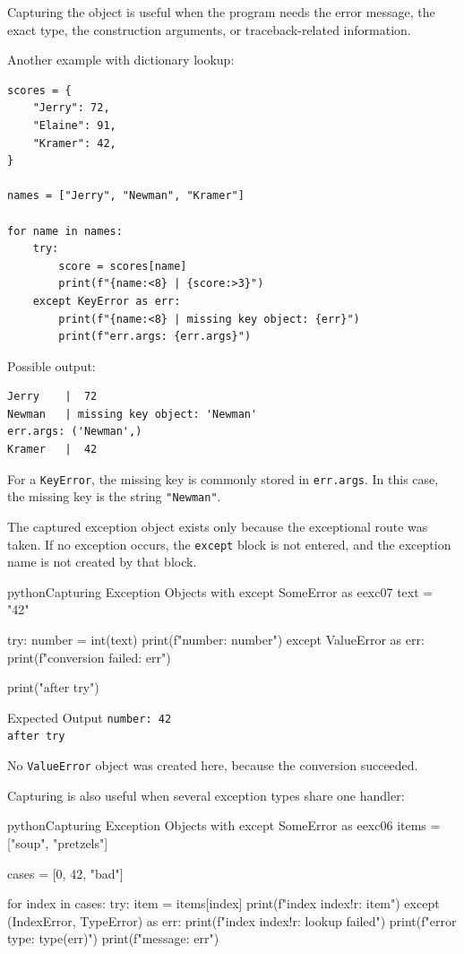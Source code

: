 \documentclass[a4paper,twoside]{report}
\begin{document}
Capturing the object is useful when the program needs the error message, the exact type, the construction arguments, or traceback-related information.

Another example with dictionary lookup:

\begin{verbatim}
scores = {
    "Jerry": 72,
    "Elaine": 91,
    "Kramer": 42,
}

names = ["Jerry", "Newman", "Kramer"]

for name in names:
    try:
        score = scores[name]
        print(f"{name:<8} | {score:>3}")
    except KeyError as err:
        print(f"{name:<8} | missing key object: {err}")
        print(f"err.args: {err.args}")
\end{verbatim}

Possible output:

\begin{verbatim}
Jerry    |  72
Newman   | missing key object: 'Newman'
err.args: ('Newman',)
Kramer   |  42
\end{verbatim}

For a \texttt{KeyError}, the missing key is commonly stored in \texttt{err.args}. In this case, the missing key is the string \texttt{"Newman"}.

The captured exception object exists only because the exceptional route was taken. If no exception occurs, the \texttt{except} block is not entered, and the exception name is not created by that block.

\begin{codebox}[]{python}{Capturing Exception Objects with except SomeError as e}{exc07}
text = "42"

try:
    number = int(text)
    print(f"number: {number}")
except ValueError as err:
    print(f"conversion failed: {err}")

print("after try")
\end{codebox}


\begin{iobox}{Expected Output}
\texttt{number: 42} \\
\texttt{after try} \\
\end{iobox}


No \texttt{ValueError} object was created here, because the conversion succeeded.

Capturing is also useful when several exception types share one handler:

\begin{codebox}[]{python}{Capturing Exception Objects with except SomeError as e}{exc06}
items = ["soup", "pretzels"]

cases = [0, 42, "bad"]

for index in cases:
    try:
        item = items[index]
        print(f"index {index!r}: {item}")
    except (IndexError, TypeError) as err:
        print(f"index {index!r}: lookup failed")
        print(f"error type: {type(err)}")
        print(f"message: {err}")
\end{codebox}
\end{document}

